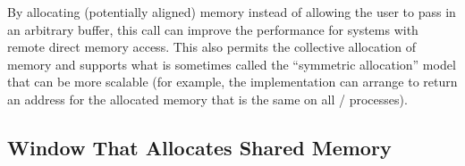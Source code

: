 \begin{rationale}
By allocating (potentially aligned) memory instead of allowing the user
to pass in an arbitrary buffer, this call can improve the performance
for systems with remote direct memory access. 
This also permits the collective allocation of memory and
  supports what is sometimes called the ``symmetric allocation'' model
  that can be more scalable (for example, the implementation can
  arrange to return an address for the allocated memory that is the
  same on all \mpi/ processes).
\end{rationale}

\subsection{Window That Allocates Shared Memory}
\label{sec:winallocshared}

